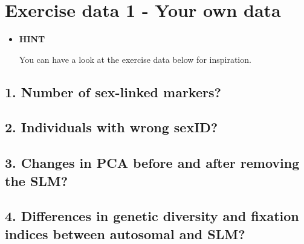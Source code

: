 \documentclass[
  letterpaper,
  DIV=11,
  numbers=noendperiod]{scrreprt}
\newenvironment{infobox}[1]
  {
  \begin{blackbox}
  \begin{itemize}
  \renewcommand{\labelitemi}{
    \raisebox{-.7\height}[0pt][0pt]{
      {\setkeys{Gin}{width=3em,keepaspectratio}
        \texttt{[image: images/\#1]}}
    }
  }
  \setlength{\fboxsep}{1em}
  
  \item
  }
  {
  
  \end{itemize}
  \end{blackbox}
  }
\let\textttOrig\texttt
\renewcommand{\texttt}[1]{\textttOrig{\color{blue}{#1}}}
\begin{document}
\hypertarget{exercise-data-1---your-own-data}{%
\section*{Exercise data 1 - Your own
data}\label{exercise-data-1---your-own-data}}


\begin{infobox}{task}
\textbf{HINT}

You can have a look at the exercise data below for inspiration.

\end{infobox}

\hypertarget{number-of-sex-linked-markers}{%
\subsection*{1. Number of sex-linked
markers?}\label{number-of-sex-linked-markers}}

\hypertarget{individuals-with-wrong-sexid}{%
\subsection*{2. Individuals with wrong
sexID?}\label{individuals-with-wrong-sexid}}

\hypertarget{changes-in-pca-before-and-after-removing-the-slm}{%
\subsection*{3. Changes in PCA before and after removing the
SLM?}\label{changes-in-pca-before-and-after-removing-the-slm}}

\hypertarget{differences-in-genetic-diversity-and-fixation-indices-between-autosomal-and-slm}{%
\subsection*{4. Differences in genetic diversity and fixation indices
between autosomal and
SLM?}\label{differences-in-genetic-diversity-and-fixation-indices-between-autosomal-and-slm}}
\end{document}

